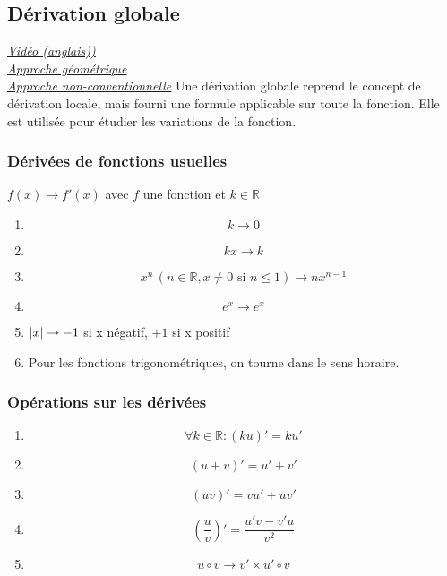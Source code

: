 \documentclass{article}
\begin{document}
\subsection{Dérivation globale}
\href{https://youtu.be/9vKqVkMQHKk}{\underline{\textit{Vidéo (anglais))}}}\\
\href{https://youtu.be/S0_qX4VJhMQ}{\underline{\textit{Approche géométrique}}}\\
\href{https://youtu.be/CfW845LNObM}{\underline{\textit{Approche non-conventionnelle}}}
\break
Une dérivation globale reprend le concept de dérivation locale, mais fourni une formule applicable sur toute la fonction. Elle est utilisée pour étudier les variations de la fonction.

\subsubsection{Dérivées de fonctions usuelles}
$f(x) \rightarrow f'(x)$ avec $f$ une fonction et $k\in\mathbb{R}$
\begin{enumerate}
	\item[] $$k \rightarrow 0$$
	\item[] $$kx \rightarrow k$$
	\item[] $$x^n \, (n\in\mathbb{R}, x\ne 0 \text{ si } n\le 1) \rightarrow nx^{n-1}$$
	\item[] $$e^x \rightarrow e^x$$
	\item[] \begin{center}
	      $\abs{x} \rightarrow -1$ si x négatif,  $+1$ si x positif
	\end{center}
	\item[] \begin{center}Pour les fonctions trigonométriques, on tourne dans le sens horaire.\end{center}
\end{enumerate}

\subsubsection{Opérations sur les dérivées}
\begin{enumerate}
	\item[] $$\forall k \in \mathbb{R} : (ku)' = ku'$$
	\item[] $$(u+v)' = u' +v'$$
	\item[] $$(uv)' = vu' + uv'$$
	\item[] $$(\frac{u}{v})' = \frac{u'v-v'u}{v^2} $$
	\item[] $$u\circ v \rightarrow v'  \times u'\circ v$$
\end{enumerate}
\end{document}
